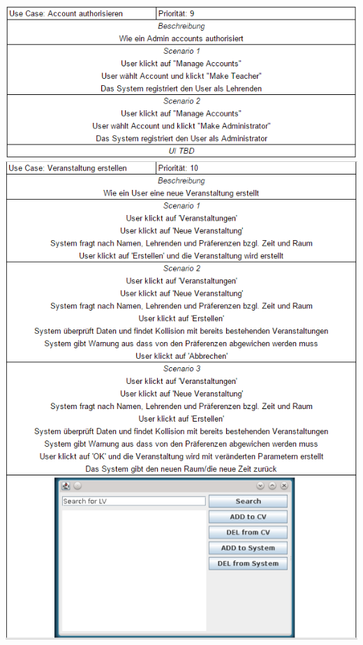 \documentclass[a4paper,12pt]{article}
\begin{document}
\begin{center}
		\includegraphics[scale=.8]{UCAuthorizeAccount.png}
		\includegraphics[scale=.8]{UCCreateHappening.png}

\end{center}
\end{document}
